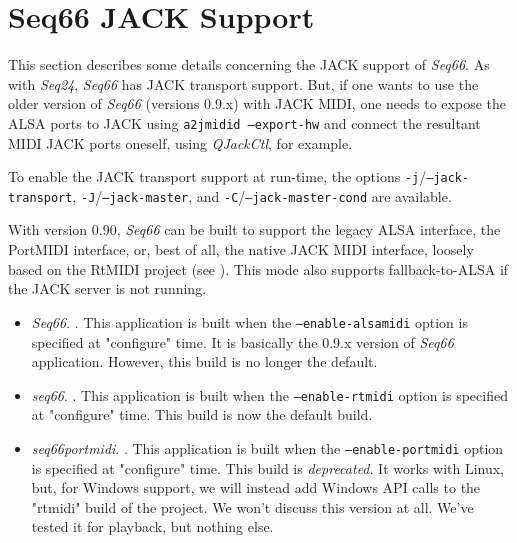 %
%
%

\section{Seq66 JACK Support}
\label{sec:jack}

   This section describes some details concerning the JACK support of
   \textsl{Seq66}.
   As with \textsl{Seq24}, \textsl{Seq66} has JACK transport support.
   But, if one wants to use the older version of \textsl{Seq66} (versions
   0.9.x) with JACK MIDI, one needs to expose the ALSA ports to JACK using
   \texttt{a2jmidid --export-hw} and connect the resultant MIDI JACK ports
   oneself, using \textsl{QJackCtl}, for example.

   To enable the JACK transport support at run-time, the options
   \texttt{-j}/\texttt{--jack-transport}, \texttt{-J}/\texttt{--jack-master},
   and \texttt{-C}/\texttt{--jack-master-cond} are available.

   With version 0.90, \textsl{Seq66} can be built to support the legacy
   ALSA interface, the PortMIDI interface, or, best of all, the native JACK
   MIDI interface, loosely based on the RtMIDI project
   (see \cite{rtmidi}).  This mode also supports fallback-to-ALSA if the JACK
   server is not running.

   \begin{itemize}
      \item \textsl{Seq66}.
         .
         This application is built when the
         \texttt{--enable-alsamidi} option is specified at "configure" time.
         It is basically the 0.9.x version of \textsl{Seq66} application.
         However, this build is no longer the default.
      \item \textsl{seq66}.
         .
         This application is built when the
         \texttt{--enable-rtmidi} option is specified at "configure" time.
         This build is now the default build.
      \item \textsl{seq66portmidi}.
         .
         This application is built when the
         \texttt{--enable-portmidi} option is specified at "configure" time.
         This build is \textsl{deprecated}.  It works with Linux, but, for
         Windows support, we will instead add Windows API calls to the "rtmidi"
         build of the project.  We won't discuss this version at all.  We've
         tested it for playback, but nothing else.
   \end{itemize}

